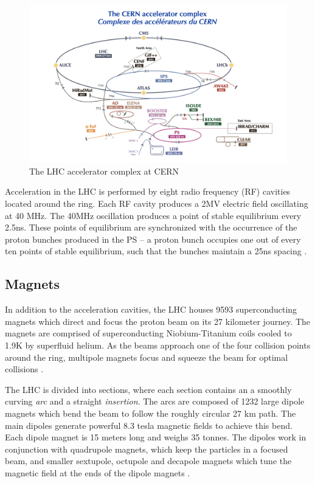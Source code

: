 \begin{figure}
	\includegraphics[width=\textwidth]{figures/ch2/accelerator_complex.png}
	\caption{The LHC accelerator complex at CERN \cite{cern_accelerator_complex}}
	\label{fig:accelerator_complex}
\end{figure}

 Acceleration in the LHC is performed by eight radio frequency (RF) cavities located around the ring. Each RF cavity produces a 2MV electric field oscillating at 40 MHz. The 40MHz oscillation produces a point of stable equilibrium every 2.5ns. These points of equilibrium are synchronized with the occurrence of the proton bunches produced in the PS -- a proton bunch occupies one out of every ten points of stable equilibrium, such that the bunches maintain a 25ns spacing \cite{lhc_faq}. \\

\subsection{Magnets}
In addition to the acceleration cavities, the LHC houses 9593 superconducting magnets which direct and focus the proton beam on its 27 kilometer journey. The magnets are comprised of superconducting Niobium-Titanium coils cooled to 1.9K by superfluid helium. As the beams approach one of the four collision points around the ring, multipole magnets focus and squeeze the beam for optimal collisions \cite{lhc_faq}.

The LHC is divided into sections, where each section contains an a smoothly curving \textit{arc} and a straight \textit{insertion}. The arcs are composed of 1232 large dipole magnets which bend the beam to follow the roughly circular 27 km path. The main dipoles generate powerful 8.3 tesla magnetic fields to achieve this bend. Each dipole magnet is 15 meters long and weighs 35 tonnes. The dipoles work in conjunction with quadrupole magnets, which keep the particles in a focused beam, and smaller sextupole, octupole and decapole magnets which tune the magnetic field at the ends of the dipole magnets \cite{lhc_magnets}.

